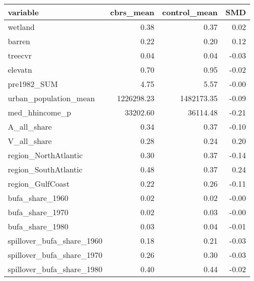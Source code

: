 \begin{table}[ht]
\centering
\begin{tabular}{lrrr}
  \hline
variable & cbrs\_mean & control\_mean & SMD \\ 
  \hline
wetland & 0.38 & 0.37 & 0.02 \\ 
  barren & 0.22 & 0.20 & 0.12 \\ 
  treecvr & 0.04 & 0.04 & -0.03 \\ 
  elevatn & 0.70 & 0.95 & -0.02 \\ 
  pre1982\_SUM & 4.75 & 5.57 & -0.00 \\ 
  urban\_population\_mean & 1226298.23 & 1482173.35 & -0.09 \\ 
  med\_hhincome\_p & 33202.60 & 36114.48 & -0.21 \\ 
  A\_all\_share & 0.34 & 0.37 & -0.10 \\ 
  V\_all\_share & 0.28 & 0.24 & 0.20 \\ 
  region\_NorthAtlantic & 0.30 & 0.37 & -0.14 \\ 
  region\_SouthAtlantic & 0.48 & 0.37 & 0.24 \\ 
  region\_GulfCoast & 0.22 & 0.26 & -0.11 \\ 
  bufa\_share\_1960 & 0.02 & 0.02 & -0.00 \\ 
  bufa\_share\_1970 & 0.02 & 0.03 & -0.00 \\ 
  bufa\_share\_1980 & 0.03 & 0.04 & -0.01 \\ 
  spillover\_bufa\_share\_1960 & 0.18 & 0.21 & -0.03 \\ 
  spillover\_bufa\_share\_1970 & 0.26 & 0.30 & -0.03 \\ 
  spillover\_bufa\_share\_1980 & 0.40 & 0.44 & -0.02 \\ 
   \hline
\end{tabular}
\end{table}
